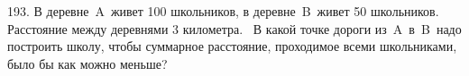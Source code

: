 193. В деревне A живет 100 школьников, в деревне B живет 50 школьников. Расстояние между деревнями 3 километра. 
В какой точке дороги из A в B надо построить школу, чтобы суммарное расстояние, проходимое всеми школьниками, было бы как можно меньше?\\
